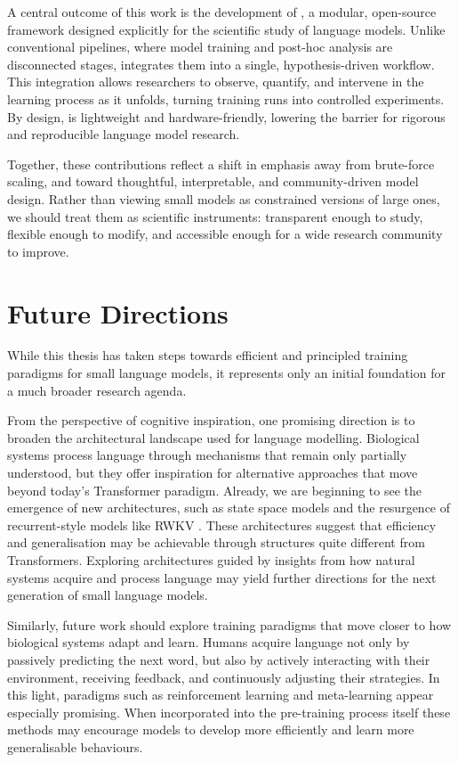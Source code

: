A central outcome of this work is the development of \pico, a modular, open-source framework designed explicitly for the scientific study of language models. Unlike conventional pipelines, where model training and post-hoc analysis are disconnected stages, \pico integrates them into a single, hypothesis-driven workflow. This integration allows researchers to observe, quantify, and intervene in the learning process as it unfolds, turning training runs into controlled experiments. By design, \pico is lightweight and hardware-friendly, lowering the barrier for rigorous and reproducible language model research.

Together, these contributions reflect a shift in emphasis away from brute-force scaling, and toward thoughtful, interpretable, and community-driven model design. Rather than viewing small models as constrained versions of large ones, we should treat them as scientific instruments: transparent enough to study, flexible enough to modify, and accessible enough for a wide research community to improve.

\section*{Future Directions}

While this thesis has taken steps towards efficient and principled training paradigms for small language models, it represents only an initial foundation for a much broader research agenda.

From the perspective of cognitive inspiration, one promising direction is to broaden the architectural landscape used for language modelling. Biological systems process language through mechanisms that remain only partially understood, but they offer inspiration for alternative approaches that move beyond today's Transformer paradigm. Already, we are beginning to see the emergence of new architectures, such as state space models \citep{gu2021efficiently,gu2023mamba} and the resurgence of recurrent-style models like RWKV \citep{peng2023rwkv}. These architectures suggest that efficiency and generalisation may be achievable through structures quite different from Transformers. Exploring architectures guided by insights from how natural systems acquire and process language may yield further directions for the next generation of small language models.

Similarly, future work should explore training paradigms that move closer to how biological systems adapt and learn. Humans acquire language not only by passively predicting the next word, but also by actively interacting with their environment, receiving feedback, and continuously adjusting their strategies. In this light, paradigms such as reinforcement learning and meta-learning appear especially promising. When incorporated into the pre-training process itself these methods may encourage models to develop more efficiently and learn more generalisable behaviours.

